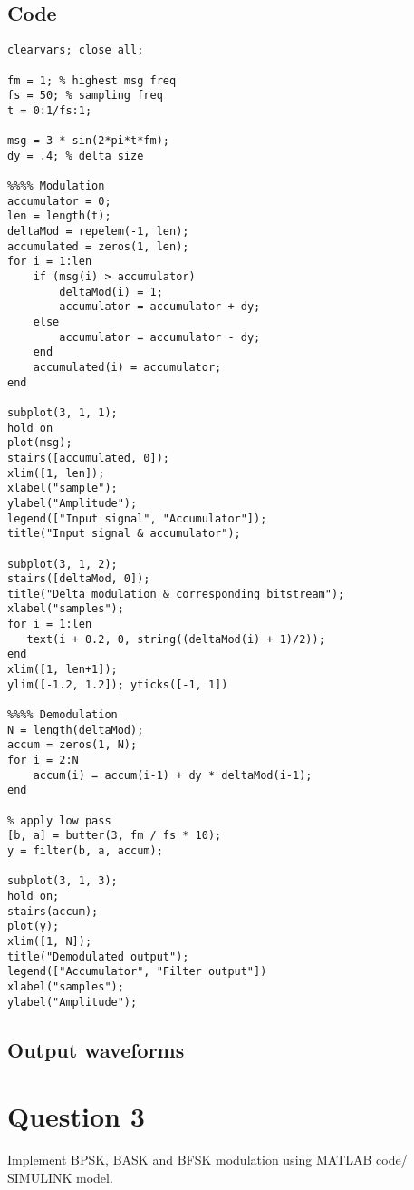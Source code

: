 \documentclass[12pt,a4paper]{report}
\begin{document}
\subsection*{Code}

\begin{verbatim}
clearvars; close all;

fm = 1; % highest msg freq
fs = 50; % sampling freq
t = 0:1/fs:1;

msg = 3 * sin(2*pi*t*fm);
dy = .4; % delta size

%%%% Modulation
accumulator = 0;
len = length(t);
deltaMod = repelem(-1, len);
accumulated = zeros(1, len);
for i = 1:len
    if (msg(i) > accumulator)
        deltaMod(i) = 1;
        accumulator = accumulator + dy;
    else
        accumulator = accumulator - dy;
    end
    accumulated(i) = accumulator;
end

subplot(3, 1, 1);
hold on
plot(msg);
stairs([accumulated, 0]);
xlim([1, len]);
xlabel("sample");
ylabel("Amplitude");
legend(["Input signal", "Accumulator"]);
title("Input signal & accumulator");

subplot(3, 1, 2);
stairs([deltaMod, 0]);
title("Delta modulation & corresponding bitstream");
xlabel("samples");
for i = 1:len
   text(i + 0.2, 0, string((deltaMod(i) + 1)/2));
end
xlim([1, len+1]);
ylim([-1.2, 1.2]); yticks([-1, 1])

%%%% Demodulation
N = length(deltaMod);
accum = zeros(1, N);
for i = 2:N
    accum(i) = accum(i-1) + dy * deltaMod(i-1);
end

% apply low pass
[b, a] = butter(3, fm / fs * 10);
y = filter(b, a, accum);

subplot(3, 1, 3);
hold on;
stairs(accum);
plot(y);
xlim([1, N]);
title("Demodulated output");
legend(["Accumulator", "Filter output"])
xlabel("samples");
ylabel("Amplitude");
\end{verbatim}

\subsection*{Output waveforms}
\begin{figure*}[!h]
    
\end{figure*}

\section*{Question 3}
Implement BPSK, BASK and BFSK modulation using MATLAB code/ SIMULINK model.
\end{document}
